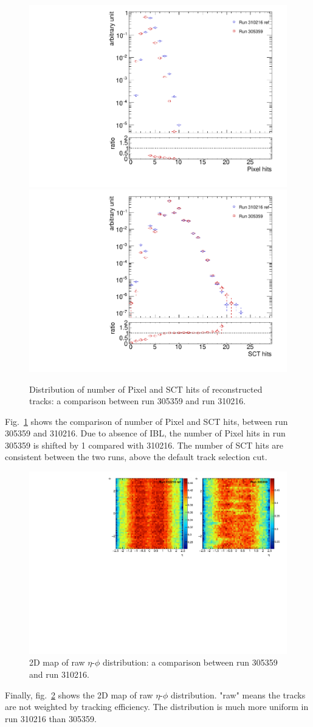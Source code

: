 \begin{figure}[H]
\centering
\includegraphics[width=0.45\linewidth]{figs/sec_evtSlc/GRLpp2016/305359_dis_pixHit.pdf}
\includegraphics[width=0.45\linewidth]{figs/sec_evtSlc/GRLpp2016/305359_dis_sctHit.pdf}
\caption{Distribution of number of Pixel and SCT hits of reconstructed tracks: a comparison between run 305359 and run 310216.}
\label{fig:GRLpp2016_305359_pixHit_sctHit}
\end{figure}
Fig.~\ref{fig:GRLpp2016_305359_pixHit_sctHit} shows the comparison of number of Pixel and SCT hits, between run 305359 and 310216. Due to absence of IBL, the number of Pixel hits in run 305359 is shifted by 1 compared with 310216. The number of SCT hits are consistent between the two runs, above the default track selection cut.

\begin{figure}[H]
\centering
\includegraphics[width=0.9\linewidth]{figs/sec_evtSlc/GRLpp2016/305359_crr_eta_phi.pdf}
\caption{2D map of raw $\eta$-$\phi$ distribution: a comparison between run 305359 and run 310216.}
\label{fig:GRLpp2016_305359_eta_phi}
\end{figure}
Finally, fig.~\ref{fig:GRLpp2016_305359_eta_phi} shows the 2D map of raw $\eta$-$\phi$ distribution. "raw" means the tracks are not weighted by tracking efficiency. The distribution is much more uniform in run 310216 than 305359.

